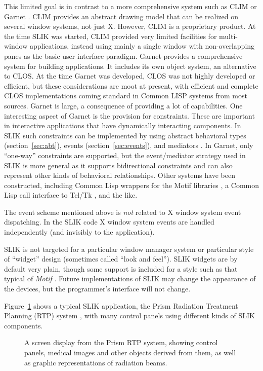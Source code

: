\documentclass[twoside,openright,11pt]{report}
\begin{document}
This limited goal is in contrast to a more comprehensive system such
as CLIM \cite{mckay92} or Garnet \cite{myers90}.  CLIM provides an
abstract drawing model that can be realized on several window systems,
not just X.  However, CLIM is a proprietary product.  At the time SLIK
was started, CLIM provided very limited facilities for multi-window
applications, instead using mainly a single window with
non-overlapping panes as the basic user interface paradigm.  Garnet
provides a comprehensive system for building applications.  It
includes its own object system, an alternative to CLOS.  At the time
Garnet was developed, CLOS was not highly developed or efficient, but
these considerations are moot at present, with efficient and complete
CLOS implementations coming standard in Common LISP systems from most
sources.  Garnet is large, a consequence of providing a lot of
capabilities.  One interesting aspect of Garnet is the provision for
constraints.  These are important in interactive applications that
have dynamically interacting components.  In SLIK such constraints can
be implemented by using abstract behavioral types
(section~\ref{sec:abt}), events (section~\ref{sec:events}), and
mediators \cite{sullivan94}.  In Garnet, only ``one-way'' constraints
are supported, but the event/mediator strategy used in SLIK is more
general as it supports bidirectional constraints and can also
represent other kinds of behavioral relationships.  Other systems have
been constructed, including Common Lisp wrappers for the Motif
libraries \cite{openmotif2004}, a Common Lisp call interface to Tcl/Tk
\cite{ousterhout94}, and the like.

The event scheme mentioned above is \emph{not} related to X window
system event dispatching.  In the SLIK code X window system events are
handled independently (and invisibly to the application).

SLIK is not targeted for a particular window manager system or
particular style of ``widget'' design (sometimes called ``look and
feel'').  SLIK widgets are by default very plain, though some support
is included for a style such as that typical of \textit{Motif}
\cite{berlage91}.  Future implementations of SLIK may change the
appearance of the devices, but the programmer's interface will not
change.

Figure~\ref{fig:prism-screen} shows a typical SLIK application, the
Prism Radiation Treatment Planning (RTP) system \cite{kalet96}, with
many control panels using different kinds of SLIK components.

\begin{figure}[htb]
\begin{center}
\vspace*{2mm}
\leavevmode
{}
\end{center}
\caption{A screen display from the Prism RTP system, showing control
panels, medical images and other objects derived from them, as well as
graphic representations of radiation beams.}
\label{fig:prism-screen}
\end{figure}
\end{document}
